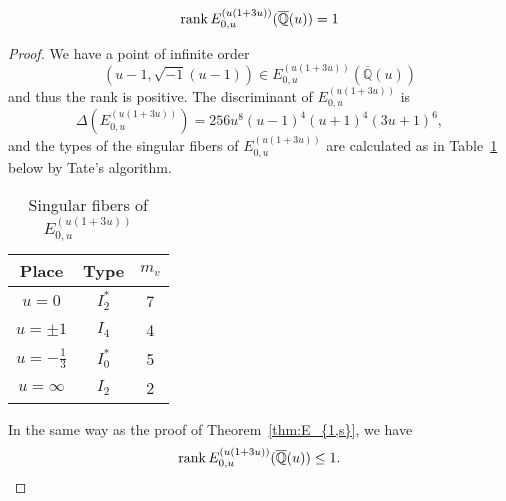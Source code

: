 \documentclass[main]{subfiles}
\begin{document}
\begin{thm}
    \begin{equation*}
        \operatorname{rank} E_{0,u}^{(u(1 + 3u))}(\overline{\mathbb{Q}}(u)) = 1
    \end{equation*}
\end{thm}
\begin{proof}
    We have a point of infinite order
    \begin{equation*}
        (u - 1, \sqrt{-1}(u - 1)) \in E_{0,u}^{(u(1 + 3u))}(\overline{\mathbb{Q}}(u))
    \end{equation*}
    and thus the rank is positive.
    The discriminant of $E_{0,u}^{(u(1 + 3u))}$ is
    \begin{equation*}
        \Delta(E_{0,u}^{(u(1 + 3u))}) = 256u^{8}(u - 1)^{4}(u + 1)^{4}(3u + 1)^{6},
    \end{equation*}
    and the types of the singular fibers of $E_{0,u}^{(u(1 + 3u))}$ are calculated as in Table~\ref{tab:E_{0,u}^{(u(1 + 3u))}} below by Tate's algorithm.
    \begin{table}[ht]
        \centering
        \caption{Singular fibers of $E_{0,u}^{(u(1 + 3u))}$}
        \begin{tabular}{|c|c|c|}
            \hline
            Place            & Type    & $m_v$ \\
            \hline
            $u=0$            & $I_2^*$ & 7     \\
            $u=\pm 1$        & $I_4$   & 4     \\
            $u=-\frac{1}{3}$ & $I_0^*$ & 5     \\
            $u=\infty$       & $I_2$   & 2     \\
            \hline
        \end{tabular}
        \label{tab:E_{0,u}^{(u(1 + 3u))}}
    \end{table}
    In the same way as the proof of Theorem~\ref{thm:E_{1,s}}, we have
    \begin{equation*}
        \operatorname{rank} E_{0,u}^{(u(1 + 3u))}(\overline{\mathbb{Q}}(u)) \leq 1.
    \end{equation*}
\end{proof}
\end{document}
